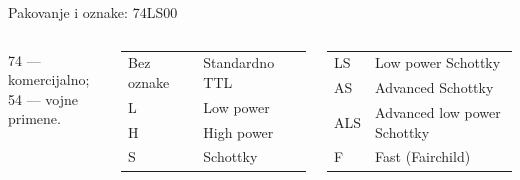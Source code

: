 \begin{frame}[label=10-s075]{Pakovanje i oznake: 74LS00}
\setlength{\abovedisplayskip}{4pt}\setlength{\belowdisplayskip}{4pt}\setlength{\abovedisplayshortskip}{3pt}\setlength{\belowdisplayshortskip}{3pt}
\begin{columns}[T,onlytextwidth]
74 — komercijalno; 54 — vojne primene.\par\smallskip
\begin{tabular}{ll}Bez oznake&Standardno TTL\\L&Low power\\H&High power\\S&Schottky\end{tabular}
\begin{tabular}{ll}LS&Low power Schottky\\AS&Advanced Schottky\\ALS&Advanced low power Schottky\\F&Fast (Fairchild)\end{tabular}\end{columns}\smallskip
\centering
\end{frame}
